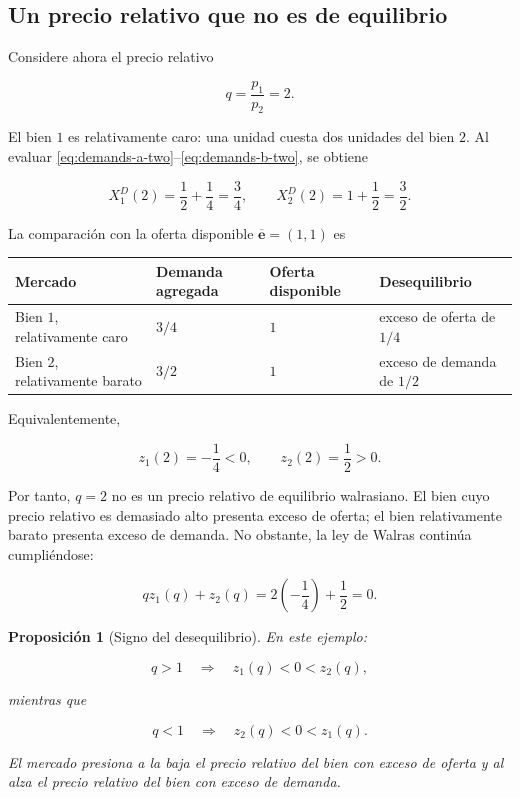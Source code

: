 \documentclass[12pt]{article}
\theoremstyle{cideplain}
\newtheorem{proposition}[theorem]{Proposición}
\theoremstyle{cidedef}
\newcommand{\e}{\bm e}
\begin{document}
\subsection{Un precio relativo que no es de equilibrio}

Considere ahora el precio relativo

\[
  q=\frac{p_1}{p_2}=2.
\]

El bien \(1\) es relativamente caro: una unidad cuesta dos unidades del bien \(2\).
Al evaluar \eqref{eq:demands-a-two}--\eqref{eq:demands-b-two}, se obtiene

\[
  X_1^D(2)
  =
  \frac12+\frac14
  =
  \frac34,
  \qquad
  X_2^D(2)
  =
  1+\frac12
  =
  \frac32.
\]

La comparación con la oferta disponible \(\overline{\e}=(1,1)\) es

\begin{center}
\small
\begin{tabular}{p{}p{}p{}p{}}
\hline
Mercado & Demanda agregada & Oferta disponible & Desequilibrio\\
\hline
Bien \(1\), relativamente caro
  & \(3/4\) & \(1\) & exceso de oferta de \(1/4\)\\
Bien \(2\), relativamente barato
  & \(3/2\) & \(1\) & exceso de demanda de \(1/2\)\\
\hline
\end{tabular}
\end{center}

Equivalentemente,

\[
  z_1(2)=-\frac14<0,
  \qquad
  z_2(2)=\frac12>0.
\]

Por tanto, \(q=2\) no es un precio relativo de equilibrio walrasiano. El bien cuyo precio
relativo es demasiado alto presenta exceso de oferta; el bien relativamente barato presenta
exceso de demanda. No obstante, la ley de Walras continúa cumpliéndose:

\[
  qz_1(q)+z_2(q)
  =
  2\left(-\frac14\right)+\frac12
  =
  0.
\]

\begin{proposition}[Signo del desequilibrio]
En este ejemplo:

\[
  q>1
  \quad\Longrightarrow\quad
  z_1(q)<0<z_2(q),
\]

mientras que

\[
  q<1
  \quad\Longrightarrow\quad
  z_2(q)<0<z_1(q).
\]

El mercado presiona a la baja el precio relativo del bien con exceso de oferta y al alza el
precio relativo del bien con exceso de demanda.
\end{proposition}
\end{document}

